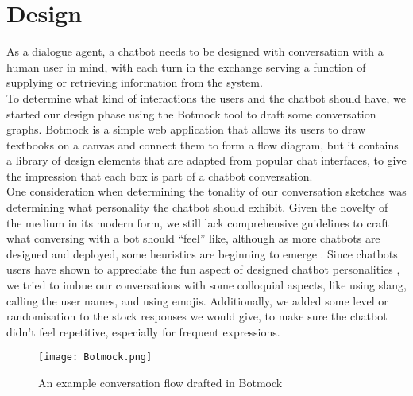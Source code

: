 \section{Design}
As a dialogue agent, a chatbot needs to be designed with conversation with a human user in mind, with each turn in the exchange serving a function of supplying or retrieving information from the system. \\
To determine what kind of interactions the users and the chatbot should have, we started our design phase using the Botmock tool to draft some conversation graphs. Botmock is a simple web application that allows its users to draw textbooks on a canvas and connect them to form a flow diagram, but it contains a library of design elements that are adapted from popular chat interfaces, to give the impression that each box is part of a chatbot conversation. \\
One consideration when determining the tonality of our conversation sketches was determining what personality the chatbot should exhibit. Given the novelty of the medium in its modern form, we still lack comprehensive guidelines to craft what conversing with a bot should ``feel'' like, although as more chatbots are designed and deployed, some heuristics are beginning to emerge \cite{jessie}. Since chatbots users have shown to appreciate the fun aspect of designed chatbot personalities \cite{10.1007/978-3-319-67744-6_28}, we tried to imbue our conversations with some colloquial aspects, like using slang, calling the user names, and using emojis. Additionally, we added some level or randomisation to the stock responses we would give, to make sure the chatbot didn't feel repetitive, especially for frequent expressions. \\

\begin{figure}[h!]
  \texttt{[image: Botmock.png]}
  \caption{An example conversation flow drafted in Botmock}
\end{figure}


